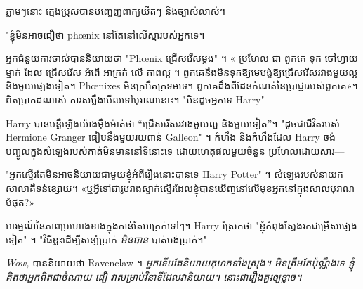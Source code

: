 ភ្លាមៗនោះ ក្មេងប្រុសបានបញ្ចេញពាក្យយឺតៗ និងច្បាស់លាស់។

"ខ្ញុំមិនអាចជឿថា phœnix នៅតែនៅលើស្មារបស់អ្នកទេ។

អ្នកជំនួយការចាស់បាននិយាយថា "Phœnix ជ្រើសរើសម្តង" ។ « ប្រហែល ជា ពួកគេ ទុក ចៅហ្វាយ ម្នាក់ ដែល ជ្រើសរើស អំពើ អាក្រក់ លើ ភាពល្អ ។ ពួកគេនឹងមិនទុកឱ្យមេបង្ខំឱ្យជ្រើសរើសរវាងមួយល្អនិងមួយផ្សេងទៀត។ Phœnixes មិនក្រអឺតក្រទមទេ។ ពួកគេដឹងពីដែនកំណត់នៃប្រាជ្ញារបស់ពួកគេ»។ ពិតប្រាកដណាស់ ការសម្លឹងមើលទៅបុរាណនោះ។ "មិនដូចអ្នកទេ Harry"

Harry បានបន្លឺឡើងយ៉ាងម៉ឺងម៉ាត់ថា “ជ្រើសរើសរវាងមួយល្អ និងមួយទៀត”។ "ដូចជាជីវិតរបស់ Hermione Granger ធៀបនឹងមួយរយពាន់ Galleon" ។ កំហឹង និង​កំហឹង​ដែល Harry ចង់​បញ្ចូល​ក្នុង​សំឡេង​របស់​គាត់​មិន​មាន​នៅ​ទី​នោះ​ទេ ដោយ​ហេតុផល​មួយ​ចំនួន ប្រហែល​ដោយសារ—

"អ្នកស្ទើរតែមិនអាចនិយាយជាមួយខ្ញុំអំពីរឿងនោះបានទេ Harry Potter" ។ សំឡេង​របស់​នាយក​សាលា​គឺ​ទន់​ខ្សោយ។ «ឬ​អ្វី​ទៅ​ជា​រូបរាង​ស្ទាក់​ស្ទើរ​ដែល​ខ្ញុំ​បាន​ឃើញ​នៅ​លើ​មុខ​អ្នក​នៅ​ក្នុង​សាល​បុរាណ​បំផុត?»

អារម្មណ៍នៃភាពប្រហោងខាងក្នុងកាន់តែអាក្រក់ទៅៗ។ Harry ស្រែកថា "ខ្ញុំកំពុងស្វែងរកជម្រើសផ្សេងទៀត" ។ "វិធីខ្លះដើម្បីសន្សំប្រាក់ \emph{មិនបាន} បាត់បង់ប្រាក់។"

\emph{Wow,} បាននិយាយថា Ravenclaw ។ \emph{អ្នកទើបតែនិយាយកុហកទាំងស្រុង។ មិនត្រឹមតែប៉ុណ្ណឹងទេ ខ្ញុំគិតថាអ្នកពិតជាចំណាយ \emph{ជឿ} វាសម្រាប់វិនាទីដែលវានិយាយ។ នោះ​ជា​រឿង​គួរ​ឲ្យ​ខ្លាច។}

